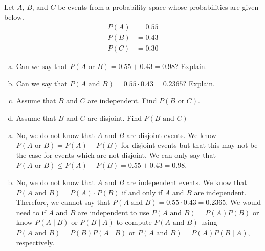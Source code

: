 \documentclass[12pt,letterpaper]{exam}
\begin{document}
\examtitle
{} 
\scores
\bottomline
\newpage


\begin{questions}

\newpage
\question[10] Let $A$, $B$, and $C$ be events from a probability space whose probabilities are given below.
	\[
	\begin{aligned}
	P(A)&= 0.55 \\
	P(B)&= 0.43 \\
	P(C)&= 0.30
	\end{aligned}
	\]

\begin{enumerate}[(a)]
\item Can we say that $P(A \text{ or } B)= 0.55 + 0.43= 0.98$? Explain. 
\item Can we say that $P(A \text{ and } B)= 0.55 \cdot 0.43= 0.2365$? Explain. 
\item Assume that $B$ and $C$ are independent. Find $P(B \text{ or } C)$. 
\item Assume that $B$ and $C$ are disjoint. Find $P(B \text{ and } C)$
\end{enumerate} \pspace

\sol 
\begin{enumerate}[(a)]
\item No, we do not know that $A$ and $B$ are disjoint events. We know $P(A \text{ or } B)= P(A) + P(B)$ for disjoint events but that this may not be the case for events which are not disjoint. We can only say that $P(A \text{ or } B) \leq P(A) + P(B)= 0.55 + 0.43= 0.98$. \pspace

\item No, we do not know that $A$ and $B$ are independent events. We know that $P(A \text{ and } B)= P(A) \cdot P(B)$ if and only if $A$ and $B$ are independent. Therefore, we cannot say that $P(A \text{ and } B)= 0.55 \cdot 0.43= 0.2365$. We would need to if $A$ and $B$ are independent to use $P(A \text{ and } B)= P(A) P(B)$ or know $P(A \;|\; B)$ or $P(B \;|\; A)$ to compute $P(A \text{ and } B)$ using $P(A \text{ and } B)= P(B) P(A \;|\; B)$ or $P(A \text{ and } B)= P(A) P(B \;|\; A)$, respectively. \pspace


\end{enumerate}
\end{questions}
\end{document}
